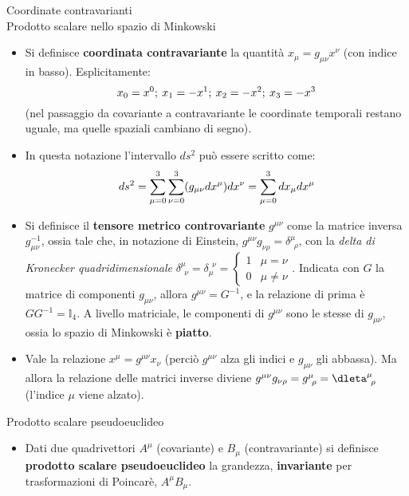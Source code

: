 \documentclass[a4_2,grid,frame]{flashcards}
\newenvironment{cartaflash}
    {\vspace{-15pt}
    \begin{itemize}
    }
    {
    \end{itemize}
    }
\begin{document}
\begin{flashcard}[Formule]{Coordinate contravarianti\\Prodotto scalare nello spazio di Minkowski}
\begin{cartaflash}
\item Si definisce \textbf{coordinata contravariante} la quantità $x_\mu = g_{\mu\nu} x^\nu$ (con indice in basso). Esplicitamente:
\vspace{-8pt}
\[
x_0 = x^0; \> x_1 = -x^1; \> x_2 = -x^2; \> x_3 = -x^3
\vspace{-8pt}
\]
(nel passaggio da covariante a contravariante le coordinate temporali restano uguale, ma quelle spaziali cambiano di segno).
\vspace{-8pt}
\item In questa notazione l'intervallo $ds^2$ può essere scritto come:
\vspace{-8pt}
\[
ds^2 = \sum_{\mu = 0}^3 \sum_{\nu = 0}^3 (g_{\mu\nu} dx^\mu) dx^\nu = \sum_{\mu = 0}^3 dx_\mu dx^\mu 
\vspace{-8pt}
\]
\item Si definisce il \textbf{tensore metrico controvariante} $g^{\mu\nu}$ come la matrice inversa $g_{\mu\nu}^{-1}$, ossia tale che, in notazione di Einstein, $g^{\mu\nu} g_{\nu\rho} = \delta^\mu_{\>\>\rho}$, con la \textit{delta di Kronecker quadridimensionale} $\delta^\mu_{\>\>\nu} = \delta^{\>\>\nu}_{\mu} = \begin{cases}
1 & \mu=\nu\\
0 & \mu\neq \nu
\end{cases}$. Indicata con $G$ la matrice di componenti $g_{\mu\nu}$, allora $g^{\mu\nu} = G^{-1}$, e la relazione di prima è $G G^{-1} = \mathbb{I}_4$. A livello matriciale, le componenti di $g^{\mu\nu}$ sono le stesse di $g_{\mu\nu}$, ossia lo spazio di Minkowski è \textbf{piatto}.
\vspace{-8pt}
\item Vale la relazione $x^\mu = g^{\mu\nu}x_\nu$ (perciò $g^{\mu\nu}$ alza gli indici e $g_{\mu\nu}$ gli abbassa). Ma allora la relazione delle matrici inverse diviene $g^{\mu\nu} g_{\nu\rho} = g^\mu_{\>\>\rho} = \dleta^\mu_{\>\>\rho}$ (l'indice $\mu$ viene alzato).  
\end{cartaflash}
\end{flashcard}

\begin{flashcard}[Definizione]{Prodotto scalare pseudoeuclideo}
\begin{cartaflash}
\item Dati due quadrivettori $A^\mu$ (covariante) e $B_\mu$ (contravariante) si definisce \textbf{prodotto scalare pseudoeuclideo} la grandezza, \textbf{invariante} per trasformazioni di Poincarè, $A^\mu B_\mu$.
\end{cartaflash}
\end{flashcard}
\end{document}
